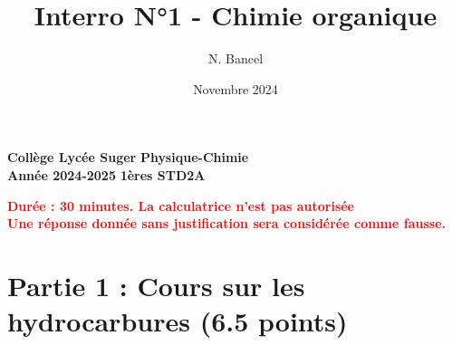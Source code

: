 \documentclass{exam}
\title{Interro N°1 - Chimie organique}
\author{N. Bancel}
\date{Novembre 2024}
\begin{document}
\textbf{Collège Lycée Suger}
\hfill
\textbf{Physique-Chimie} \\

\textbf{Année 2024-2025}
\hfill
\textbf{1ères STD2A} \par

{\let\newpage\relax\maketitle}

\begin{center}
\textbf{\textcolor{red}{Durée : 30 minutes. La calculatrice n'est pas autorisée}} \\
\textbf{\textcolor{red}{Une réponse donnée sans justification sera considérée comme fausse.}} \\

\end{center}

\section*{Partie 1 : Cours sur les hydrocarbures (6.5 points)}
\end{document}
